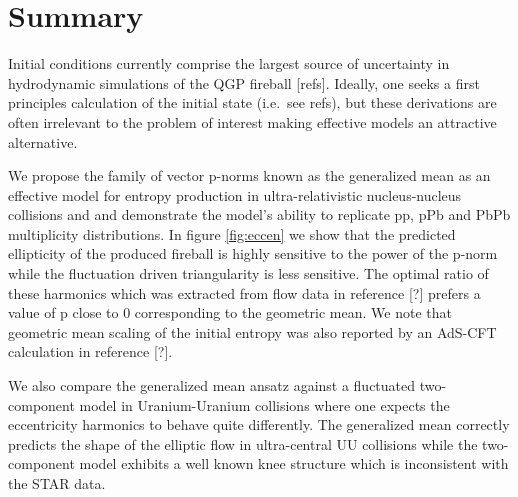 \documentclass[aps,prl,reprint,amsmath,nofootinbib]{revtex4-1}
\begin{document}
\section{Summary}

Initial conditions currently comprise the largest source of uncertainty in hydrodynamic simulations of the QGP
fireball [refs]. Ideally, one seeks a first principles calculation of the initial state (i.e.\ see refs), but
these derivations are often irrelevant to the problem of interest making effective models an attractive
alternative.

We propose the family of vector p-norms known as the generalized mean as an effective model for entropy
production in ultra-relativistic nucleus-nucleus collisions and and demonstrate the model's ability to
replicate pp, pPb and PbPb multiplicity distributions. In figure \ref{fig:eccen} we show that the predicted
ellipticity of the produced fireball is highly sensitive to the power of the p-norm while the fluctuation
driven triangularity is less sensitive. The optimal ratio of these harmonics which was extracted from flow
data in reference [?] prefers a value of p close to 0 corresponding to the geometric mean. We note that
geometric mean scaling of the initial entropy was also reported by an AdS-CFT calculation in reference [?].

We also compare the generalized mean ansatz against a fluctuated two-component model in Uranium-Uranium
collisions where one expects the eccentricity harmonics to behave quite differently. The generalized mean
correctly predicts the shape of the elliptic flow in ultra-central UU collisions while the two-component model
exhibits a well known knee structure which is inconsistent with the STAR data.



\end{document}
